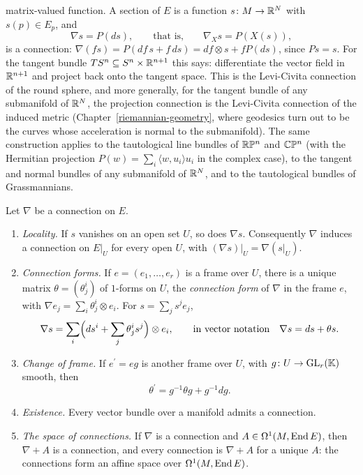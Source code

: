 \begin{example}
\begin{enumerate}
matrix-valued function. A section of $E$ is a function $s \colon M \to \mathbb{R}^N$ with $s(p) \in E_p$, and
\[
\nabla s = P(ds), \qquad\text{that is,}\qquad \nabla_Xs = P(X(s)),
\]
is a connection: $\nabla(fs) = P(df\,s + f\,ds) = df \otimes s + fP(ds)$, since $Ps = s$. For the tangent bundle $TS^n \subseteq S^n \times \mathbb{R}^{n+1}$ this says: differentiate
the vector field in $\mathbb{R}^{n+1}$ and project back onto the tangent space. This is the Levi-Civita connection of the round sphere, and more generally, for the tangent bundle of any submanifold of
$\mathbb{R}^N$, the projection connection is the Levi-Civita connection of the induced metric (Chapter~\ref{riemannian-geometry}, where geodesics turn out to be the curves whose acceleration is normal to the
submanifold). The same
construction applies to the tautological line bundles of $\mathbb{R}\mathbb{P}^n$ and $\mathbb{C}\mathbb{P}^n$ (with the Hermitian projection $P(w) = \sum_i\langle w, u_i\rangle u_i$ in the complex case),
to the tangent and normal bundles of any submanifold of $\mathbb{R}^N$, and to the tautological bundles of Grassmannians.
\end{enumerate}
\end{example}

\begin{proposition}\label{connections:proposition-connections-exist}
Let $\nabla$ be a connection on $E$.
\begin{enumerate}
\item \emph{Locality.} If $s$ vanishes on an open set $U$, so does $\nabla s$. Consequently $\nabla$ induces a connection on $E|_U$ for every open $U$, with
$(\nabla s)|_U = \nabla(s|_U)$.
\item \emph{Connection forms.} If $e = (e_1, \ldots, e_r)$ is a frame over $U$, there is a unique matrix $\theta = (\theta^i_j)$ of $1$-forms on $U$, the \emph{connection form} of
$\nabla$ in the frame $e$, with $\nabla e_j = \sum_i\theta^i_j \otimes e_i$. For $s = \sum_js^je_j$,
\[
\nabla s = \sum_i\Bigl(ds^i + \sum_j\theta^i_js^j\Bigr) \otimes e_i, \qquad\text{in vector notation}\quad \nabla s = ds + \theta s .
\]
\item \emph{Change of frame.} If $e^{\prime} = eg$ is another frame over $U$, with $g \colon U \to \mathrm{GL}_r(\mathbb{K})$ smooth, then
\[
\theta^{\prime} = g^{-1}\theta g + g^{-1}dg .
\]
\item \emph{Existence.} Every vector bundle over a manifold admits a connection.
\item \emph{The space of connections.} If $\nabla$ is a connection and $A \in \Omega^1(M, \operatorname{End} E)$, then $\nabla + A$ is a connection, and every connection is $\nabla + A$ for a
unique $A$: the connections form an affine space over $\Omega^1(M, \operatorname{End} E)$.
\end{enumerate}
\end{proposition}

